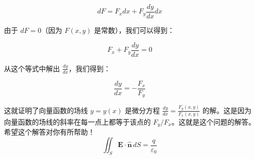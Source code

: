\documentclass[12pt, a4paper, oneside]{ctexart}
\begin{document}
$$
    dF = F_x dx + F_y \frac{dy}{dx} dx
$$

由于 \(dF = 0\)（因为 \(F(x, y)\) 是常数），我们可以得到：

$$
    F_x + F_y \frac{dy}{dx} = 0
$$

从这个等式中解出 \(\frac{dy}{dx}\)，我们得到：

$$
    \frac{dy}{dx} = -\frac{F_x}{F_y}
$$

这就证明了向量函数的场线 \(y = y(x)\) 是微分方程 \(\frac{dy}{dx} = \frac{F_y(x, y)}{F_x(x, y)}\) 的解。这是因为向量函数的场线的斜率在每一点上都等于该点的 \(F_y/F_x\)。这就是这个问题的解答。希望这个解答对你有所帮助！
\begin{equation}
    \iint_{S} \mathbf{E} \cdot \hat{\mathbf{n}} \, dS = \frac{q}{\varepsilon_0} \tag{II-1}
\end{equation}
\end{document}
